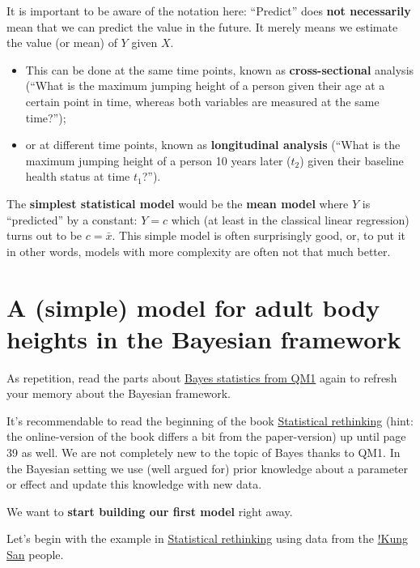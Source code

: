 \documentclass[
]{book}
\providecommand{\tightlist}{%
  \setlength{\itemsep}{0pt}\setlength{\parskip}{0pt}}
\begin{document}
It is important to be aware of the notation here:
``Predict'' does \textbf{not necessarily} mean that we can predict the value in
the future. It merely means we estimate the value (or mean) of \(Y\) given \(X\).

\begin{itemize}
\tightlist
\item
  This can be done at the same time points, known as \textbf{cross-sectional} analysis (``What is the maximum jumping height
  of a person given their age at a certain point in time, whereas both variables are measured at the same time?'');
\item
  or at different time points, known as \textbf{longitudinal analysis} (``What is the maximum jumping height of a person 10 years later (\(t_2\))
  given their baseline health status at time \(t_1\)?'').
\end{itemize}

The \textbf{simplest statistical model} would be the \textbf{mean model} where \(Y\) is ``predicted'' by a
constant: \(Y = c\) which (at least in the classical linear regression) turns out to be \(c = \bar{x}\).
This simple model is often surprisingly good, or, to put it in other words, models with more complexity
are often not that much better.

\section{A (simple) model for adult body heights in the Bayesian framework}\label{a-simple-model-for-adult-body-heights-in-the-bayesian-framework}

As repetition, read the parts about \href{https://jdegenfellner.github.io/Script_QM1_ZHAW/bayes_statistics.html}{Bayes statistics from QM1}
again to refresh your memory about the Bayesian framework.

It's recommendable to read the beginning of the book \href{https://civil.colorado.edu/~balajir/CVEN6833/bayes-resources/RM-StatRethink-Bayes.pdf}{Statistical rethinking}
(hint: the online-version of the book differs a bit from the paper-version)
up until page 39 as well. We are not completely new to the topic of Bayes thanks
to QM1. In the Bayesian setting we use (well argued for) prior knowledge about a
parameter or effect and update this knowledge with new data.

We want to \textbf{start building our first model} right away.

Let's begin with the example in
\href{https://civil.colorado.edu/~balajir/CVEN6833/bayes-resources/RM-StatRethink-Bayes.pdf}{Statistical rethinking}
using data from the \href{https://en.wikipedia.org/wiki/\%C7\%83Kung_people}{!Kung San}
people.
\end{document}

